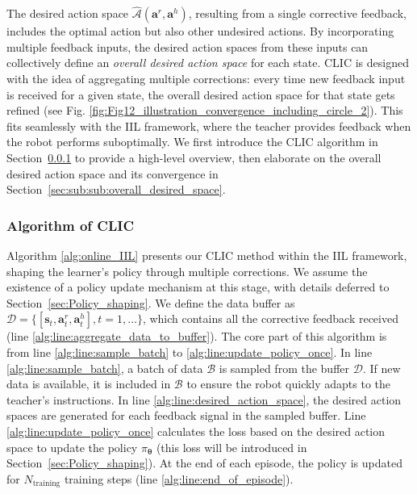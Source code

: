         

The desired action space $\hat{\mathcal{A}}(\bm a^r, \bm a^h)$, resulting from a single corrective feedback,  includes the optimal action but also other undesired actions. 
By incorporating multiple feedback inputs, the desired action spaces from these inputs can collectively define an \textit{overall desired action space} for each state. 
CLIC is designed with the idea of aggregating multiple corrections: every time new feedback input is received for a given state, the overall desired action space for that state gets refined (see Fig. \ref{fig:Fig12_illustration_convergence_including_circle_2}).
This fits seamlessly with the IIL framework, where the teacher provides feedback when the robot performs suboptimally.
We first introduce the CLIC algorithm in Section~\ref{sec:sub:sub:algorithm_CLIC} to provide a high-level overview, then elaborate on the overall desired action space and its convergence in Section~\ref{sec:sub:sub:overall_desired_space}.

\subsubsection{Algorithm of CLIC}
\label{sec:sub:sub:algorithm_CLIC}
Algorithm \ref{alg:online_IIL} presents our CLIC method within the IIL framework, shaping the learner's policy through multiple corrections.
We assume the existence of a policy update mechanism at this stage, with details deferred to  Section~\ref{sec:Policy_shaping}.
We define the data buffer as $\mathcal{D} = \{[\bm s_t, \bm a^r_t, \bm a^h_t], t = 1, \dots \}$, which contains all the corrective feedback received (line \ref{alg:line:aggregate_data_to_buffer}).
The core part of this algorithm is from line \ref{alg:line:sample_batch} to \ref{alg:line:update_policy_once}.
In line \ref{alg:line:sample_batch}, a batch of data $\mathcal{B}$ is sampled from the buffer $\mathcal{D}$.
If new data is available, it is included in $\mathcal{B}$ to ensure the robot quickly adapts to the teacher's instructions.
In line \ref{alg:line:desired_action_space}, the desired action spaces are generated for each feedback signal in the sampled buffer.
Line \ref{alg:line:update_policy_once} calculates the loss based on the desired action space to update the policy $\pi_{\bm \theta}$ (this loss will be introduced in Section~\ref{sec:Policy_shaping}).
At the end of each episode, the policy is updated for $N_{\text{training}}$ training steps (line \ref{alg:line:end_of_episode}).

